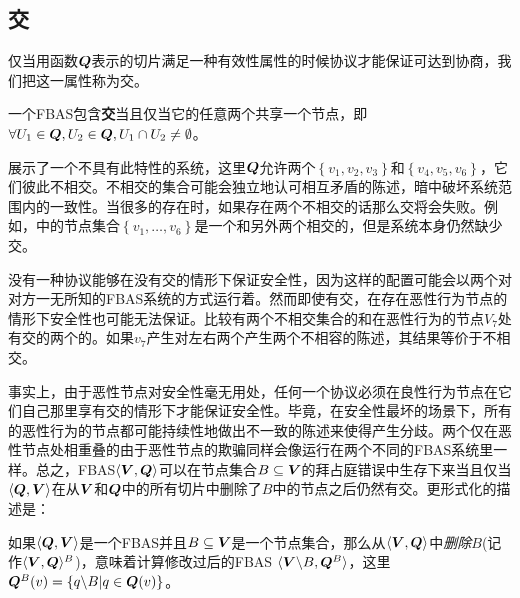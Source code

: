 \subsection{{\quorum}交}\label{sec:quorum_intersect}

仅当用函数${\bm Q}$表示的{\quorum}切片满足一种有效性属性的时候协议才能保证可达到协商，我们把这一属性称为{\quorum}交。

\begin{definition}[{\quorum}交]
	一个FBAS包含\textbf{{\quorum}交}当且仅当它的任意两个{\quorum}共享一个节点，即$\forall U_1\in{\bm Q},U_2\in{\bm Q},U_1\cap U_2\neq\emptyset$。
\end{definition}

展示了一个不具有此特性的系统，这里${\bm Q}$允许两个{\quorum}$\left\{v_1,v_2,v_3\right\}$和$\left\{v_4,v_5,v_6\right\}$，它们彼此不相交。不相交的集合可能会独立地认可相互矛盾的陈述，暗中破坏系统范围内的一致性。当很多的{\quorum}存在时，如果存在两个不相交的话那么{\quorum}交将会失败。例如，中的节点集合$\left\{v_1,\ldots ,v_6\right\}$是一个和另外两个{\quorum}相交的{\quorum}，但是系统本身仍然缺少{\quorum}交。

没有一种协议能够在没有{\quorum}交的情形下保证安全性，因为这样的配置可能会以两个对对方一无所知的FBAS系统的方式运行着。然而即使有{\quorum}交，在存在恶性行为节点的情形下安全性也可能无法保证。比较有两个不相交集合的和在恶性行为的节点$V_7$处有交的两个{\quorum}的。如果$v_7$产生对左右两个{\quorum}产生两个不相容的陈述，其结果等价于不相交{\quorum}。

事实上，由于恶性节点对安全性毫无用处，任何一个协议必须在良性行为节点在它们自己那里享有{\quorum}交的情形下才能保证安全性。毕竟，在安全性最坏的场景下，所有的恶性行为的节点都可能持续性地做出不一致的陈述来使得{\quorum}产生分歧。两个仅在恶性节点处相重叠的{\quorum}由于恶性节点的欺骗同样会像运行在两个不同的FBAS系统里一样。总之，FBAS$\langle {\bm V},{\bm Q}\rangle$可以在节点集合$B\subseteq {\bm V}$的拜占庭错误中生存下来当且仅当$\langle{\bm Q},{\bm V}\rangle$在从${\bm V}$和${\bm Q}$中的所有切片中删除了$B$中的节点之后仍然有{\quorum}交。更形式化的描述是：

\begin{definition}[删除]
	如果$\langle{\bm Q},{\bm V}\rangle$是一个FBAS并且$B\subseteq {\bm V}$是一个节点集合，那么从$\langle{\bm V},{\bm Q}\rangle$中\textit{删除}$B$(记作$\langle{\bm V},{\bm Q}\rangle^B$)，意味着计算修改过后的FBAS $\langle{\bm V}\backslash B, {\bm Q}^B\rangle$，这里${\bm Q}^B(v)=\left\{q\backslash B|q\in{\bm Q(v)}\right\}$。
\end{definition}

